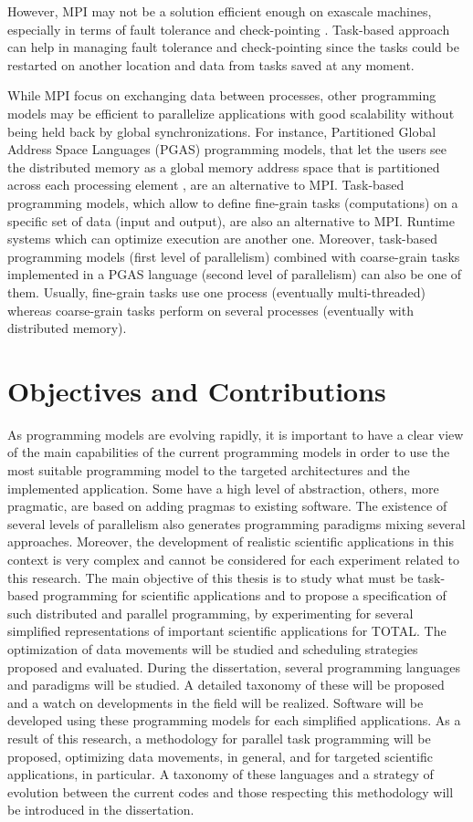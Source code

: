 However, MPI may not be a solution efficient enough on exascale machines, especially in terms of fault tolerance and check-pointing \cite{SWAAB2014}.
Task-based approach can help in managing fault tolerance and check-pointing since the tasks could be restarted on another location and data from tasks saved at any moment.

While MPI focus on exchanging data between processes, other programming models may be efficient to parallelize applications with good scalability without being held back by global synchronizations.
For instance, Partitioned Global Address Space Languages (PGAS) programming models, that let the users see the distributed memory as a global memory address space that is partitioned across each processing element \cite{CDMCE2005}, are an alternative to MPI.
Task-based programming models, which allow to define fine-grain tasks (computations) on a specific set of data (input and output), are also an alternative to MPI.
Runtime systems which can optimize execution are another one.
Moreover, task-based programming models (first level of parallelism) combined with coarse-grain tasks implemented in a PGAS language (second level of parallelism) can also be one of them.
Usually, fine-grain tasks use one process (eventually multi-threaded) whereas coarse-grain tasks perform on several processes (eventually with distributed memory).

\section{Objectives and Contributions}

As programming models are evolving rapidly, it is important to have a clear view of the main capabilities of the current programming models in order to use the most suitable programming model to the targeted architectures and the implemented application.
Some have a high level of abstraction, others, more pragmatic, are based on adding pragmas to existing software.
The existence of several levels of parallelism also generates programming paradigms mixing several approaches.
Moreover, the development of realistic scientific applications in this context is very complex and cannot be considered for each experiment related to this research.
The main objective of this thesis is to study what must be task-based programming for scientific applications and to propose a specification of such distributed and parallel programming, by experimenting for several simplified representations of important scientific applications for TOTAL.
The optimization of data movements will be studied and scheduling strategies proposed and evaluated.
During the dissertation, several programming languages and paradigms will be studied.
A detailed taxonomy of these will be proposed and a watch on developments in the field will be realized.
Software will be developed using these programming models for each simplified applications.
As a result of this research, a methodology for parallel task programming will be proposed, optimizing data movements, in general, and for targeted scientific applications, in particular.
A taxonomy of these languages and a strategy of evolution between the current codes and those respecting this methodology will be introduced in the dissertation.

